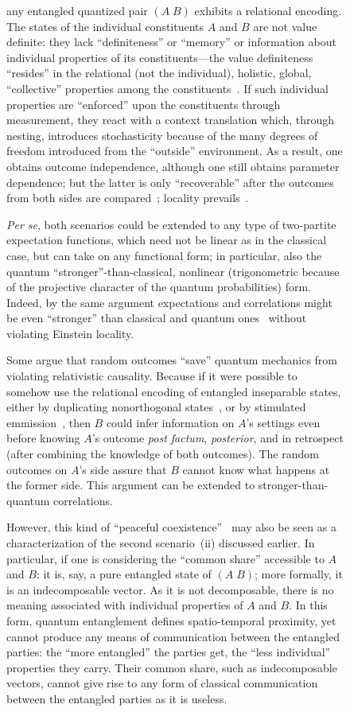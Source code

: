 \documentclass[entropy,article,accept,oneauthor,pdftex]{Definitions/mdpi}
\begin{document}
\begin{figure}[H]
\begin{itemize}
any entangled quantized pair $(A\;B)$ exhibits a relational encoding.
The states of the individual constituents $A$ and $B$ are not value definite: they lack
``definiteness'' or ``memory'' or information about individual properties
of its constituents---the value definiteness ``resides'' in the relational (not the individual),
holistic, global, ``collective'' properties among the constituents~\cite{zeil-99}.
If such individual properties are ``enforced'' upon the constituents through measurement, they react with
a context translation which, through nesting, introduces stochasticity
because of the many degrees of freedom introduced from the ``outside'' environment.
As a result, one obtains outcome independence, although one still obtains parameter dependence;
but the latter is only ``recoverable'' after the outcomes from both sides are compared~\cite{shimony2,shimony3};
locality prevails~\cite{Griffiths2010,Griffiths2020}.
\end{itemize}

{\it Per se}, both scenarios could be extended to any type
of two-partite expectation functions,
which need not be linear as in the classical case, but can take on any functional form;
in particular, also the quantum ``stronger''-than-classical,
nonlinear (trigonometric because of the projective character
of the quantum probabilities) form.
Indeed, by the same argument expectations and correlations might be even ``stronger'' than classical and quantum
ones~\cite{popescu-97,svozil-krenn,svozil-2004-brainteaser,popescu-2014}
without violating Einstein locality.

Some argue that random outcomes ``save'' quantum mechanics from violating relativistic causality.
Because if it were possible to somehow use the relational encoding of entangled inseparable states,
either by duplicating nonorthogonal states~\cite{herbert}, or by stimulated emmission~\cite{svozil-slash},
then $B$ could infer information on $A$'s settings even before knowing $A$'s outcome {\it post factum},
{\it posterior}, and in retrospect (after combining the knowledge of both outcomes).
The random outcomes on $A$'s side assure that $B$ cannot know what happens at the former side.
This argument can be extended to stronger-than-quantum correlations.

However, this kind of ``peaceful coexistence''~\cite{shimony2,shimony3} may also be seen as a characterization
of the second scenario~(ii) discussed earlier.
In particular, if one is considering the ``common share'' accessible to $A$ and $B$:
it is, say, a pure entangled state of $(A\;B)$; more formally, it is an indecomposable vector.
As it is not decomposable, there is no meaning associated with individual properties of $A$ and $B$.
In this form, quantum entanglement defines spatio-temporal proximity, yet cannot produce
any means of communication between the entangled parties:
the ``more entangled'' the parties get, the ``less individual'' properties they carry.
Their common share, such as indecomposable vectors, cannot give rise to any form of classical communication between the
entangled parties as it is useless.


\end{figure}
\end{document}
